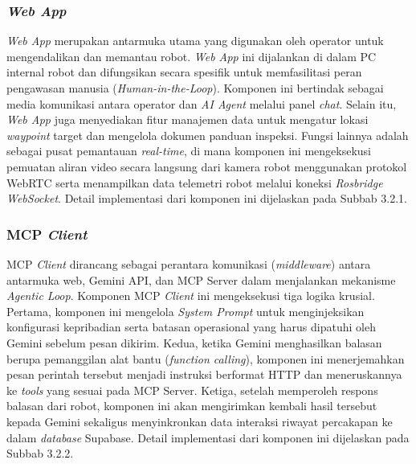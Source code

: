 \subsubsection{\textit{Web App}}
\textit{Web App} merupakan antarmuka utama yang digunakan oleh operator untuk mengendalikan dan memantau robot. \textit{Web App} ini dijalankan di dalam PC internal robot dan difungsikan secara spesifik untuk memfasilitasi peran pengawasan manusia (\textit{Human-in-the-Loop}). Komponen ini bertindak sebagai media komunikasi antara operator dan \textit{AI Agent} melalui panel \textit{chat}. Selain itu, \textit{Web App} juga menyediakan fitur manajemen data untuk mengatur lokasi \textit{waypoint} target dan mengelola dokumen panduan inspeksi. Fungsi lainnya adalah sebagai pusat pemantauan \textit{real-time}, di mana komponen ini mengeksekusi pemuatan aliran video secara langsung dari kamera robot menggunakan protokol WebRTC serta menampilkan data telemetri robot melalui koneksi \textit{Rosbridge WebSocket}. Detail implementasi dari komponen ini dijelaskan pada Subbab 3.2.1.

\subsubsection{MCP \textit{Client}}
MCP \textit{Client} dirancang sebagai perantara komunikasi (\textit{middleware}) antara antarmuka web, Gemini API, dan MCP Server dalam menjalankan mekanisme \textit{Agentic Loop}. Komponen MCP \textit{Client} ini mengeksekusi tiga logika krusial. Pertama, komponen ini mengelola \textit{System Prompt} untuk menginjeksikan konfigurasi kepribadian serta batasan operasional yang harus dipatuhi oleh Gemini sebelum pesan dikirim. Kedua, ketika Gemini menghasilkan balasan berupa pemanggilan alat bantu (\textit{function calling}), komponen ini menerjemahkan pesan perintah tersebut menjadi instruksi berformat HTTP dan meneruskannya ke \textit{tools} yang sesuai pada MCP Server. Ketiga, setelah memperoleh respons balasan dari robot, komponen ini akan mengirimkan kembali hasil tersebut kepada Gemini sekaligus menyinkronkan data interaksi riwayat percakapan ke dalam \textit{database} Supabase. Detail implementasi dari komponen ini dijelaskan pada Subbab 3.2.2.


